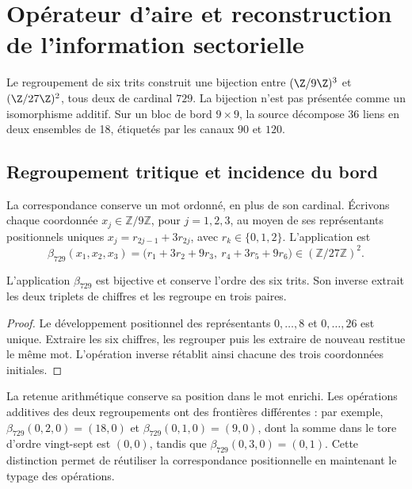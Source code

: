 \section{Opérateur d'aire et reconstruction de l'information sectorielle}
\label{v:ant:sec:area}
Le regroupement de six trits construit une bijection entre
$(\Z/9\Z)^3$ et $(\Z/27\Z)^2$, tous deux de cardinal $729$.
La bijection n'est pas présentée comme un isomorphisme additif. Sur un bloc
de bord $9\times9$, la source décompose 36 liens en deux
ensembles de 18, étiquetés par les canaux $90$ et $120$.

\subsection{Regroupement tritique et incidence du bord}
\label{v:ant:sec:ii-area-incidencia-explicita}

La correspondance conserve un mot ordonné, en plus de son cardinal.
Écrivons chaque coordonnée \(x_j\in\mathbb Z/9\mathbb Z\), pour
\(j=1,2,3\), au moyen de ses représentants positionnels uniques
\(x_j=r_{2j-1}+3r_{2j}\), avec \(r_k\in\{0,1,2\}\). L'application est
\begin{equation}
 \beta_{729}(x_1,x_2,x_3)
 =\bigl(r_1+3r_2+9r_3,\ r_4+3r_5+9r_6\bigr)
 \in(\mathbb Z/27\mathbb Z)^2.
 \label{v:ant:eq:ii-area-beta729}
\end{equation}

\begin{proposition}
\label{v:ant:prop:ii-area-beta729}
L'application \(\beta_{729}\) est bijective et conserve l'ordre des
six trits. Son inverse extrait les deux triplets de chiffres et les regroupe
en trois paires.
\end{proposition}
\begin{proof}
Le développement positionnel des représentants \(0,\ldots,8\) et
\(0,\ldots,26\) est unique. Extraire les six chiffres, les regrouper puis
les extraire de nouveau restitue le même mot. L'opération inverse
rétablit ainsi chacune des trois coordonnées initiales.
\end{proof}

La retenue arithmétique conserve sa position dans le mot enrichi. Les opérations
additives des deux regroupements ont des frontières différentes : par exemple,
\(\beta_{729}(0,2,0)=(18,0)\) et
\(\beta_{729}(0,1,0)=(9,0)\), dont la somme dans le tore d'ordre
vingt-sept est \((0,0)\), tandis que
\(\beta_{729}(0,3,0)=(0,1)\). Cette distinction permet de réutiliser
la correspondance positionnelle en maintenant le typage des opérations.

